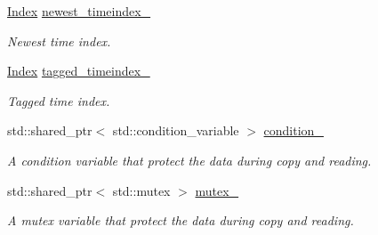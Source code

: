 \begin{DoxyCompactItemize}
\mbox{\label{classreal__time__tools_1_1ThreadsafeTimeseries_a7fd574dac314ee5d72ffdb5d578c13ac}} 
\hyperlink{classreal__time__tools_1_1ThreadsafeTimeseries_a9364696c534468d7ad927883b16ca981}{Index} \hyperlink{classreal__time__tools_1_1ThreadsafeTimeseries_a7fd574dac314ee5d72ffdb5d578c13ac}{newest\+\_\+timeindex\+\_\+}
\begin{DoxyCompactList}\small\item\em Newest time index. \end{DoxyCompactList}\item 
\mbox{\label{classreal__time__tools_1_1ThreadsafeTimeseries_a8ccddbf7eda7ac6ac257eaef39d9cbc4}} 
\hyperlink{classreal__time__tools_1_1ThreadsafeTimeseries_a9364696c534468d7ad927883b16ca981}{Index} \hyperlink{classreal__time__tools_1_1ThreadsafeTimeseries_a8ccddbf7eda7ac6ac257eaef39d9cbc4}{tagged\+\_\+timeindex\+\_\+}
\begin{DoxyCompactList}\small\item\em Tagged time index. \end{DoxyCompactList}\item 
\mbox{\label{classreal__time__tools_1_1ThreadsafeTimeseries_a46423f0837bcde91a274d49e9d8a32ee}} 
std\+::shared\+\_\+ptr$<$ std\+::condition\+\_\+variable $>$ \hyperlink{classreal__time__tools_1_1ThreadsafeTimeseries_a46423f0837bcde91a274d49e9d8a32ee}{condition\+\_\+}
\begin{DoxyCompactList}\small\item\em A condition variable that protect the data during copy and reading. \end{DoxyCompactList}\item 
\mbox{\label{classreal__time__tools_1_1ThreadsafeTimeseries_a755bd4c399df29f2f9b9d2ed748dfae5}} 
std\+::shared\+\_\+ptr$<$ std\+::mutex $>$ \hyperlink{classreal__time__tools_1_1ThreadsafeTimeseries_a755bd4c399df29f2f9b9d2ed748dfae5}{mutex\+\_\+}
\begin{DoxyCompactList}\small\item\em A mutex variable that protect the data during copy and reading. \end{DoxyCompactList}\end{DoxyCompactItemize}


